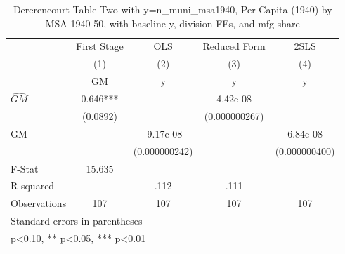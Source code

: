 \begin{table}[htbp]\centering
\def\sym#1{\ifmmode^{#1}\else\(^{#1}\)\fi}
\caption{Dererencourt Table Two with y=n\_muni\_msa1940, Per Capita (1940) by MSA 1940-50, with baseline y, division FEs, and mfg share}
\begin{tabular}{l*{4}{c}}
\toprule
                    & First Stage   &         OLS   &Reduced Form   &        2SLS   \\
                    &\multicolumn{1}{c}{(1)}&\multicolumn{1}{c}{(2)}&\multicolumn{1}{c}{(3)}&\multicolumn{1}{c}{(4)}\\
                    &\multicolumn{1}{c}{GM}&\multicolumn{1}{c}{y}&\multicolumn{1}{c}{y}&\multicolumn{1}{c}{y}\\
\midrule
$\hat{GM}$          &       0.646***&               &    4.42e-08   &               \\
                    &    (0.0892)   &               &(0.000000267)   &               \\
\addlinespace
GM                  &               &   -9.17e-08   &               &    6.84e-08   \\
                    &               &(0.000000242)   &               &(0.000000400)   \\
\midrule
F-Stat              &      15.635   &               &               &               \\
R-squared           &               &        .112   &        .111   &               \\
Observations        &         107   &         107   &         107   &         107   \\
\bottomrule
\multicolumn{5}{l}{\footnotesize Standard errors in parentheses}\\
\multicolumn{5}{l}{\footnotesize * p<0.10, ** p<0.05, *** p<0.01}\\
\end{tabular}
\end{table}

